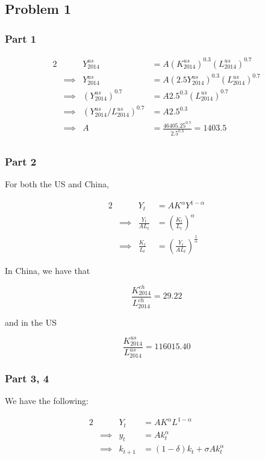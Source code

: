 \documentclass[12pt,letterpaper]{article}
\theoremstyle{definition}
\begin{document}
\subsection*{Problem 1}

\subsubsection*{Part 1}

\begin{alignat*}{2}
  &&Y_{2014}^{us} &= A(K_{2014}^{us})^{0.3}(L_{2014}^{us})^{0.7} \\
  &\implies& Y_{2014}^{us} &= A(2.5Y_{2014}^{us})^{0.3}(L_{2014}^{us})^{0.7} \\
  &\implies& (Y_{2014}^{us})^{0.7} &= A2.5^{0.3}(L_{2014}^{us})^{0.7} \\
  &\implies& (Y_{2014}^{us}/L_{2014}^{us})^{0.7} &= A2.5^{0.3} \\
  &\implies& A &= \frac{46405.25^{0.7}}{2.5^{0.3}} = 1403.5\\
\end{alignat*}

\subsubsection*{Part 2}

For both the US and China,

\begin{alignat*}{2}
  &&Y_{t} &= AK^{\alpha}Y^{1-\alpha} \\
  &\implies& \frac{Y_{t}}{AL_{t}} &= (\frac{K_{t}}{L_{t}})^\alpha \\
  &\implies& \frac{K_{t}}{L_{t}} &= (\frac{Y_{t}}{AL_{t}})^{\frac{1}{\alpha}}
\end{alignat*}

In China, we have that

\[
  \frac{K_{2014}^{ch}}{L_{2014}^{ch}} = 29.22
\]

and in the US

\[
  \frac{K_{2014}^{us}}{L_{2014}^{us}} = 116015.40
\]

\subsubsection*{Part 3, 4}

We have the following:

\begin{alignat*}{2}
  && Y_t &= AK^\alpha L^{1-\alpha} \\
  &\implies& y_t &= Ak_t^{\alpha} \\
  &\implies& k_{t+1} &= (1 - \delta)k_t + \sigma Ak_t^\alpha
\end{alignat*}
\end{document}

